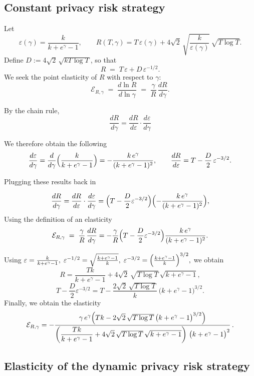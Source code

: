\documentclass[mksc,nonblindrev]{informs3}
\begin{document}
\begin{APPENDICES}
\subsection{Constant privacy risk strategy}\label{web:elasticityct}


Let
\[
\varepsilon(\gamma)=\frac{k}{k+e^\gamma-1},\qquad
R(T,\gamma)=T\,\varepsilon(\gamma)+4\sqrt{2}\,\sqrt{\frac{k}{\varepsilon(\gamma)}}\,\sqrt{T\log T}.
\]
Define \(D:=4\sqrt{2}\,\sqrt{kT\log T}\), so that
\[
R \;=\; T\,\varepsilon + D\,\varepsilon^{-1/2}.
\]
We seek the point elasticity of \(R\) with respect to \(\gamma\):
\[
\mathcal{E}_{R,\gamma}\;=\;\frac{d\ln R}{d\ln\gamma}\;=\;\frac{\gamma}{R}\,\frac{dR}{d\gamma}.
\]

By the chain rule,
\[
\frac{dR}{d\gamma}
= \frac{dR}{d\varepsilon} \cdot \frac{d\varepsilon}{d\gamma}
\]

\noindent We therefore obtain the following 
\[
\frac{d\varepsilon}{d\gamma}
=\frac{d}{d\gamma}\Bigl(\frac{k}{k+e^\gamma-1}\Bigr)
=-\frac{k\,e^\gamma}{(k+e^\gamma-1)^2},\qquad
\frac{dR}{d\varepsilon}
=T-\frac{D}{2}\,\varepsilon^{-3/2}.
\]

\noindent Plugging these results back in

\[
\frac{dR}{d\gamma}
= \frac{dR}{d\varepsilon} \cdot \frac{d\varepsilon}{d\gamma} =\Bigl(T-\frac{D}{2}\varepsilon^{-3/2}\Bigr)\Bigl(-\frac{k\,e^\gamma}{(k+e^\gamma-1)^2}\Bigr),
\]
Using the definition of an elasticity
\[\mathcal{E}_{R,\gamma}\;=\;\frac{\gamma}{R}\,\frac{dR}{d\gamma} =-\frac{\gamma}{R}\Bigl(T-\frac{D}{2}\varepsilon^{-3/2}\Bigr)\frac{k\,e^\gamma}{(k+e^\gamma-1)^2}.\]

Using
\(
\varepsilon=\frac{k}{k+e^\gamma-1},\;
\varepsilon^{-1/2}=\sqrt{\frac{k+e^\gamma-1}{k}},\;
\varepsilon^{-3/2}=\Bigl(\frac{k+e^\gamma-1}{k}\Bigr)^{3/2},
\)
we obtain
\[
R=\frac{Tk}{k+e^\gamma-1}
+4\sqrt{2}\,\sqrt{T\log T}\,\sqrt{k+e^\gamma-1},
\]
\[
T-\frac{D}{2}\varepsilon^{-3/2}
=T-\frac{2\sqrt{2}\,\sqrt{T\log T}}{k}\,\bigl(k+e^\gamma-1\bigr)^{3/2}.
\]
Finally, we obtain the elasticity
\[
\mathcal{E}_{R,\gamma}
=
-\frac{\gamma\,e^\gamma\Bigl(Tk-2\sqrt{2}\,\sqrt{T\log T}\,\bigl(k+e^\gamma-1\bigr)^{3/2}\Bigr)}
{\left(\dfrac{Tk}{k+e^\gamma-1}
+4\sqrt{2}\,\sqrt{T\log T}\,\sqrt{k+e^\gamma-1}\right)\,\bigl(k+e^\gamma-1\bigr)^{2}}
\,.
\]

\subsection{Elasticity of the dynamic privacy risk strategy}
\label{web:elasticitydynamic}


\end{APPENDICES}
\end{document}
